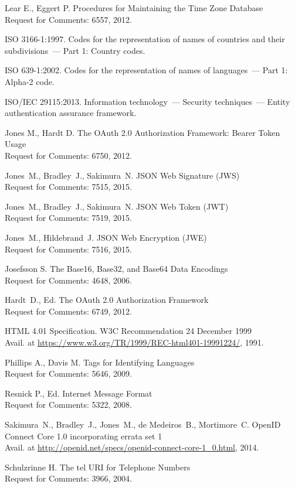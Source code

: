 \begin{thebibliography}{9}
Lear E., Eggert P.
Procedures for Maintaining the Time Zone Database\\
{\small Request for Comments: 6557, 2012.}

ISO 3166-1:1997. Codes for the representation of names of
countries and their subdivisions~--- Part 1: Country codes.

ISO 639-1:2002. Codes for the representation of names of languages~---
Part 1: Alpha-2 code.

ISO/IEC 29115:2013. Information technology~---
Security techniques~--– Entity authentication assurance framework.

Jones M., Hardt D.
The OAuth 2.0 Authorization Framework: Bearer Token Usage\\
{\small Request for Comments: 6750, 2012.}

Jones~M., Bradley~J., Sakimura~N. 
JSON Web Signature (JWS)\\
{\small Request for Comments: 7515, 2015.}

Jones~M., Bradley~J., Sakimura~N. 
JSON Web Token (JWT)\\
{\small Request for Comments: 7519, 2015.}

Jones~M., Hildebrand~J. 
JSON Web Encryption (JWE)\\
{\small Request for Comments: 7516, 2015.}

Josefsson S. 
The Base16, Base32, and Base64 Data Encodings\\
{\small Request for Comments: 4648, 2006.}

Hardt~D., Ed.
The OAuth 2.0 Authorization Framework\\
{\small Request for Comments: 6749, 2012.}

HTML 4.01 Specification. 
W3C Recommendation 24 December 1999\\
{\small Avail. at 
\url{https://www.w3.org/TR/1999/REC-html401-19991224/}, 1991.}

Phillips A., Davis M. 
Tags for Identifying Languages\\
{\small Request for Comments: 5646, 2009.}

Resnick P., Ed. 
Internet Message Format\\
{\small Request for Comments: 5322, 2008.}

Sakimura~N., Bradley~J., Jones~M., de Medeiros~B., Mortimore~C. 
OpenID Connect Core 1.0 incorporating errata set 1\\
{\small Avail. at 
\url{http://openid.net/specs/openid-connect-core-1_0.html}, 2014.}

Schulzrinne H. 
The tel URI for Telephone Numbers\\
{\small Request for Comments: 3966, 2004.}

\end{thebibliography}
